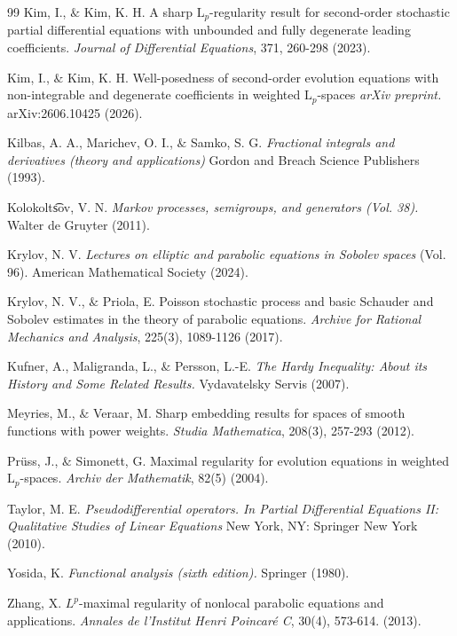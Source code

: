 \documentclass[11pt,reqno]{amsart}
\theoremstyle{definition}
\theoremstyle{remark}
\numberwithin{equation}{section}
\begin{document}
\begin{thebibliography}{99}
Kim, I., $\&$ Kim, K. H. 
A sharp $\mathrm{L}_p$-regularity result for second-order stochastic partial differential equations with unbounded and fully degenerate leading coefficients. 
\textit{Journal of Differential Equations}, 371, 260-298 (2023). 



Kim, I., $\&$ Kim, K. H. 
Well-posedness of second-order evolution equations with non-integrable and degenerate coefficients in weighted $\mathrm{L}_p$-spaces
\textit{arXiv preprint.} arXiv:2606.10425 (2026).




Kilbas, A. A., Marichev, O. I., $\&$ Samko, S. G.  
\textit{Fractional integrals and derivatives (theory and applications)}
Gordon and Breach Science Publishers (1993).


Kolokol\textasciiacute t\t{s}ov, V. N.  
\textit{Markov processes, semigroups, and generators (Vol. 38).}
Walter de Gruyter (2011).



Krylov, N. V.  
\textit{Lectures on elliptic and parabolic equations in Sobolev spaces} (Vol. 96). 
American Mathematical Society (2024).


Krylov, N. V., $\&$ Priola, E. 
Poisson stochastic process and basic Schauder and Sobolev estimates in the theory of parabolic equations. \textit{Archive for Rational Mechanics and Analysis}, 225(3), 1089-1126 (2017). 



Kufner, A., Maligranda, L., $\&$ Persson, L.-E.
\textit{The Hardy Inequality: About its History and Some Related Results.} 
Vydavatelsky Servis (2007).


Meyries, M., $\&$ Veraar, M.  
Sharp embedding results for spaces of smooth functions with power weights. 
\textit{Studia Mathematica}, 208(3), 257-293 (2012).


Prüss, J., $\&$ Simonett, G. 
Maximal regularity for evolution equations in weighted $\mathrm{L}_p$-spaces. 
\textit{Archiv der Mathematik}, 82(5) (2004).



Taylor, M. E. 
\textit{Pseudodifferential operators. In Partial Differential Equations II: Qualitative Studies of Linear Equations} 
New York, NY: Springer New York (2010).


Yosida, K. 
\textit{Functional analysis (sixth edition).} 
Springer (1980).



Zhang, X. 
$L^{p}$-maximal regularity of nonlocal parabolic equations and applications. 
\textit{Annales de l'Institut Henri Poincar\'e C}, 
30(4), 573-614. (2013).


\end{thebibliography}
\end{document}
